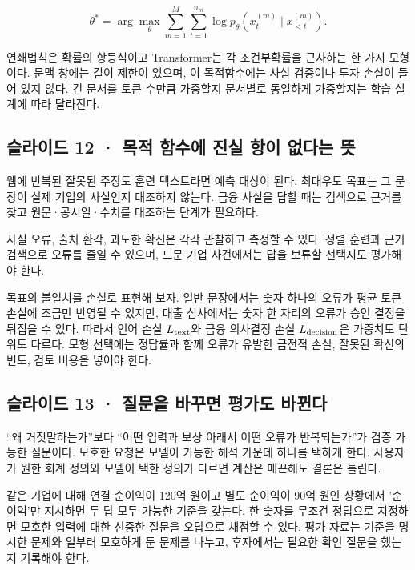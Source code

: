\documentclass[11pt,a4paper]{article}
\begin{document}
\[
\theta^*=\arg\max_\theta\sum_{m=1}^{M}\sum_{t=1}^{n_m}
\log p_\theta(x^{(m)}_t\mid x^{(m)}_{<t}).
\]

연쇄법칙은 확률의 항등식이고 Transformer는 각 조건부확률을 근사하는 한 가지 모형이다. 문맥 창에는 길이 제한이 있으며, 이 목적함수에는 사실 검증이나 투자 손실이 들어 있지 않다. 긴 문서를 토큰 수만큼 가중할지 문서별로 동일하게 가중할지는 학습 설계에 따라 달라진다.\par

\subsection{슬라이드 12 · 목적 함수에 진실 항이 없다는 뜻}
웹에 반복된 잘못된 주장도 훈련 텍스트라면 예측 대상이 된다. 최대우도 목표는 그 문장이 실제 기업의 사실인지 대조하지 않는다. 금융 사실을 답할 때는 검색으로 근거를 찾고 원문·공시일·수치를 대조하는 단계가 필요하다.\par

사실 오류, 출처 환각, 과도한 확신은 각각 관찰하고 측정할 수 있다. 정렬 훈련과 근거 검색으로 오류를 줄일 수 있으며, 드문 기업 사건에서는 답을 보류할 선택지도 평가해야 한다.\par

목표의 불일치를 손실로 표현해 보자. 일반 문장에서는 숫자 하나의 오류가 평균 토큰 손실에 조금만 반영될 수 있지만, 대출 심사에서는 숫자 한 자리의 오류가 승인 결정을 뒤집을 수 있다. 따라서 언어 손실 $L_{\rm text}$와 금융 의사결정 손실 $L_{\rm decision}$은 가중치도 단위도 다르다. 모형 선택에는 정답률과 함께 오류가 유발한 금전적 손실, 잘못된 확신의 빈도, 검토 비용을 넣어야 한다.\par

\subsection{슬라이드 13 · 질문을 바꾸면 평가도 바뀐다}
“왜 거짓말하는가”보다 “어떤 입력과 보상 아래서 어떤 오류가 반복되는가”가 검증 가능한 질문이다. 모호한 요청은 모델이 가능한 해석 가운데 하나를 택하게 한다. 사용자가 원한 회계 정의와 모델이 택한 정의가 다르면 계산은 매끈해도 결론은 틀린다.\par

같은 기업에 대해 연결 순이익이 120억 원이고 별도 순이익이 90억 원인 상황에서 '순이익'만 지시하면 두 답 모두 가능한 기준을 갖는다. 한 숫자를 무조건 정답으로 지정하면 모호한 입력에 대한 신중한 질문을 오답으로 채점할 수 있다. 평가 자료는 기준을 명시한 문제와 일부러 모호하게 둔 문제를 나누고, 후자에서는 필요한 확인 질문을 했는지 기록해야 한다.\par
\end{document}
